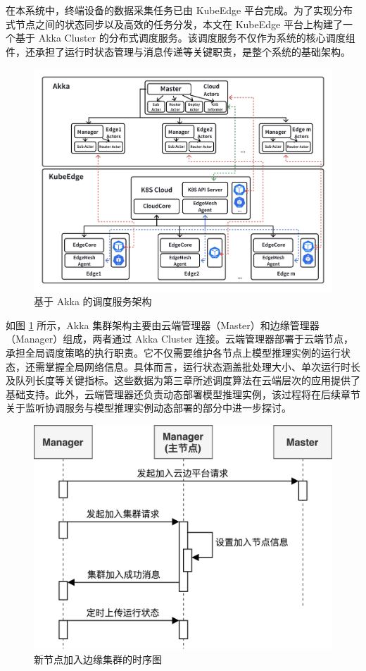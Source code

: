 在本系统中，终端设备的数据采集任务已由 KubeEdge 平台完成。为了实现分布式节点之间的状态同步以及高效的任务分发，本文在 KubeEdge 平台上构建了一个基于 Akka Cluster 的分布式调度服务。该调度服务不仅作为系统的核心调度组件，还承担了运行时状态管理与消息传递等关键职责，是整个系统的基础架构。

\begin{figure}[ht]
  \centering
  \includegraphics[width=\linewidth]{pics/4-5akka.png}
  \caption{基于 Akka 的调度服务架构}
  \label{fig:4-5akka}
\end{figure}

如图 \ref{fig:4-5akka} 所示，Akka 集群架构主要由云端管理器（Master）和边缘管理器（Manager）组成，两者通过 Akka Cluster 连接。云端管理器部署于云端节点，承担全局调度策略的执行职责。它不仅需要维护各节点上模型推理实例的运行状态，还需掌握全局网络信息。具体而言，运行状态涵盖批处理大小、单次运行时长及队列长度等关键指标。这些数据为第三章所述调度算法在云端层次的应用提供了基础支持。此外，云端管理器还负责动态部署模型推理实例，该过程将在后续章节关于监听协调服务与模型推理实例动态部署的部分中进一步探讨。

\begin{figure}[ht]
  \centering
  \includegraphics[width=0.7\linewidth]{pics/4-6集群加入.png}
  \caption{新节点加入边缘集群的时序图}
  \label{fig:4-6join}
\end{figure}


